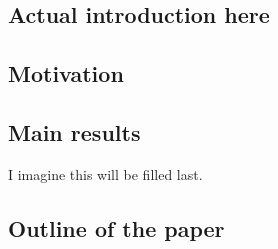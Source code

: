 \subsection{Actual introduction here}
\subsection{Motivation}
\subsection{Main results}
I imagine this will be filled last.
\subsection{Outline of the paper}
